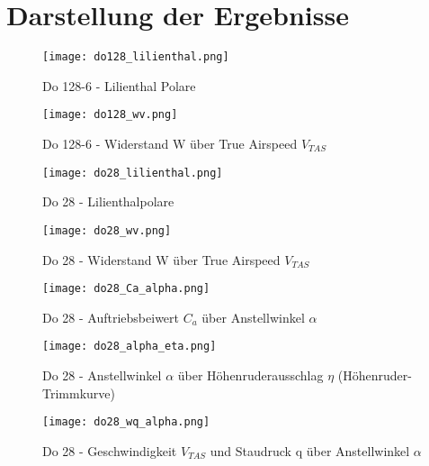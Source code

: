 \chapter{Darstellung der Ergebnisse}
\label{chapter:darstellung}
\vspace{2cm}
\begin{figure}[h]
	\begin{center}
		\texttt{[image: do128\_lilienthal.png]} 
		\caption{Do 128-6 - Lilienthal Polare} \label{abb:do128_lilienthal}
	\end{center}
\end{figure}
\begin{figure}[h]
	\begin{center}
		\texttt{[image: do128\_wv.png]} 
		\caption{Do 128-6 - Widerstand W über True Airspeed $V_{TAS}$} \label{abb:do128_wv}
	\end{center}
\end{figure}
\vspace{-10mm}
\begin{figure}[h]
	\begin{center}
		\texttt{[image: do28\_lilienthal.png]} 
		\caption{Do 28 - Lilienthalpolare} \label{abb:do28_lilienthal}
	\end{center}
\end{figure}
\begin{figure}[h]
\begin{center}
	\texttt{[image: do28\_wv.png]} 
	\caption{Do 28 - Widerstand W über True Airspeed $V_{TAS}$} \label{abb:do28_wv}
\end{center}
\end{figure}
\begin{figure}[h]
\begin{center}
	\texttt{[image: do28\_Ca\_alpha.png]} 
	\caption{Do 28 - Auftriebsbeiwert $C_a$ über Anstellwinkel $\alpha$} \label{abb:do28_ca_alpha}
\end{center}
\end{figure}
\begin{figure}[h]
\begin{center}
	\texttt{[image: do28\_alpha\_eta.png]} 
	\caption{Do 28 - Anstellwinkel $\alpha$ über Höhenruderausschlag $\eta$ (Höhenruder-Trimmkurve)} \label{abb:do28_alpha_eta}
\end{center}
\end{figure}
\begin{figure}[h]
\begin{center}
	\texttt{[image: do28\_wq\_alpha.png]} 
	\caption{Do 28 - Geschwindigkeit $V_{TAS}$ und Staudruck q über Anstellwinkel $\alpha$} \label{abb:do28_wq_alpha}
\end{center}
\end{figure}
\newpage
